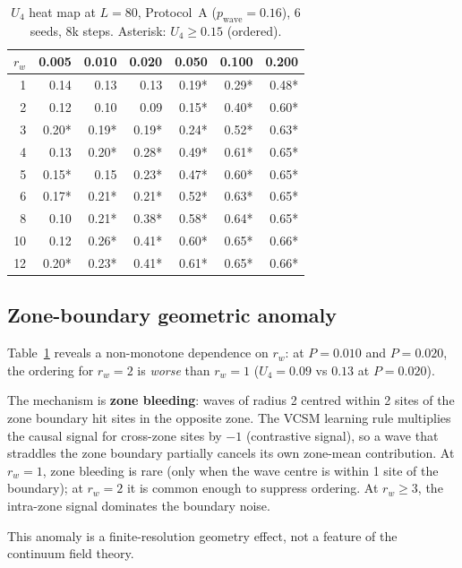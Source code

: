 \documentclass[twocolumn,10pt]{article}
\begin{document}
\begin{table}[h]
\centering
\caption{$U_4$ heat map at $L=80$, Protocol~A ($p_\mathrm{wave}=0.16$),
  6 seeds, 8k steps. Asterisk: $U_4\geq0.15$ (ordered).}
\label{tab:heatmap}
\small
\begin{tabular}{r|rrrrrr}
\toprule
$r_w$ & 0.005 & 0.010 & 0.020 & 0.050 & 0.100 & 0.200 \\
\midrule
1  & 0.14  & 0.13  & 0.13  & 0.19* & 0.29* & 0.48* \\
2  & 0.12  & 0.10  & 0.09  & 0.15* & 0.40* & 0.60* \\
3  & 0.20* & 0.19* & 0.19* & 0.24* & 0.52* & 0.63* \\
4  & 0.13  & 0.20* & 0.28* & 0.49* & 0.61* & 0.65* \\
5  & 0.15* & 0.15  & 0.23* & 0.47* & 0.60* & 0.65* \\
6  & 0.17* & 0.21* & 0.21* & 0.52* & 0.63* & 0.65* \\
8  & 0.10  & 0.21* & 0.38* & 0.58* & 0.64* & 0.65* \\
10 & 0.12  & 0.26* & 0.41* & 0.60* & 0.65* & 0.66* \\
12 & 0.20* & 0.23* & 0.41* & 0.61* & 0.65* & 0.66* \\
\bottomrule
\end{tabular}
\end{table}

\subsection{Zone-boundary geometric anomaly}

Table~\ref{tab:heatmap} reveals a non-monotone dependence on $r_w$:
at $P=0.010$ and $P=0.020$, the ordering for $r_w=2$ is
\emph{worse} than $r_w=1$ ($U_4=0.09$ vs $0.13$ at $P=0.020$).

The mechanism is \textbf{zone bleeding}: waves of radius 2 centred within 2 sites
of the zone boundary hit sites in the opposite zone.
The VCSM learning rule multiplies the causal signal for cross-zone sites by
$-1$ (contrastive signal), so a wave that straddles the zone boundary partially
cancels its own zone-mean contribution.
At $r_w=1$, zone bleeding is rare (only when the wave centre is within 1 site
of the boundary); at $r_w=2$ it is common enough to suppress ordering.
At $r_w\geq3$, the intra-zone signal dominates the boundary noise.

This anomaly is a finite-resolution geometry effect, not a feature of the
continuum field theory.
\end{document}
